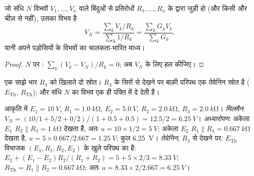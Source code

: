 \begin{proposition}[मिलमैन की प्रमेय]\label{prop:b1:dc-circuits:millman}
जो संधि $N$ विभवों $V_1, \dots, V_n$ वाले बिंदुओं से प्रतिरोधों
$R_1, \dots, R_n$ के द्वारा जुड़ी हो (और किसी और चीज़ से नहीं), उसका
विभव है
\[
V_N = \frac{\sum_k V_k/R_k}{\sum_k 1/R_k} = \frac{\sum_k G_k V_k}{\sum_k G_k},
\]
यानी अपने पड़ोसियों के विभवों का चालकता-भारित माध्य।
\end{proposition}

\begin{proof}
$N$ पर : $\sum_k (V_k - V_N)/R_k = 0$; अब $V_N$ के लिए हल कीजिए।
\end{proof}

\begin{omfigure}

{\small एक साझे भार $R_3$ को खिलाते दो स्रोत। $R_3$ के सिरों से देखने पर
बाक़ी परिपथ एक तेवेनिन स्रोत है
($E_{\mathrm{Th}}$, $R_{\mathrm{Th}}$); और  संधि $N$ का विभव
एक ही पंक्ति में दे देती है।}
\end{omfigure}

\begin{example}[एक ही उत्तर तक तीन रास्ते]\label{ex:b1:dc-circuits:threeways}
आकृति में $E_1 = \qty{10}{V}$, $R_1 = \qty{1.0}{k\ohm}$, $E_2 =
\qty{5.0}{V}$, $R_2 = \qty{2.0}{k\ohm}$, $R_3 = \qty{2.0}{k\ohm}$।
\emph{मिलमैन}: $V_N = (10/1 + 5/2 + 0/2)/(1 + 0.5 + 0.5) = 12.5/2 =
\qty{6.25}{V}$। \emph{अध्यारोपण}: अकेला $E_1$ $R_2 \parallel
R_3 = \qty{1}{k\ohm}$ देखता है, अतः $u = 10 \times 1/2 = \qty{5}{V}$; अकेला $E_2$
$R_1 \parallel R_3 = \qty{0.667}{k\ohm}$ देखता है, $u = 5 \times 0.667/2.667
= \qty{1.25}{V}$; कुल \qty{6.25}{V}। \emph{तेवेनिन},
$R_3$ से देखने पर: $E_{\mathrm{Th}}$ विभाजक
$(E_1, R_1, R_2, E_2)$ के खुले परिपथ का  है: $E_2 + (E_1 - E_2)R_2/(R_1 + R_2) = 5 + 5 \times
2/3 = \qty{8.33}{V}$; $R_{\mathrm{Th}} = R_1 \parallel R_2 =
\qty{0.667}{k\ohm}$; अतः $u = 8.33 \times 2/2.667 = \qty{6.25}{V}$।
\end{example}

